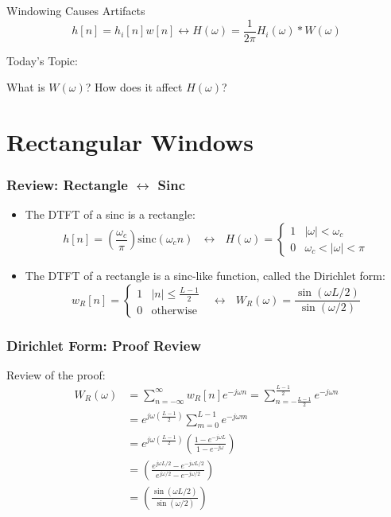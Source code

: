 \documentclass{beamer}
\begin{document}
\begin{frame}
  \begin{block}{Windowing Causes Artifacts}
    \[
    h[n] = h_{i}[n]w[n] \leftrightarrow H(\omega) = \frac{1}{2\pi}H_i(\omega)\ast W(\omega)
    \]
  \end{block}
  \begin{block}{Today's Topic:}
    \centerline{What is $W(\omega)$? How does it affect $H(\omega)$?}
  \end{block}
\end{frame}

\section[Rectangular]{Rectangular Windows}
\setcounter{subsection}{1}

\begin{frame}
  \frametitle{Review: Rectangle $\leftrightarrow$ Sinc}

  \begin{itemize}
  \item The DTFT of a sinc is a rectangle:
    \begin{displaymath}
      h[n] = \left(\frac{\omega_c}{\pi}\right)\mbox{sinc}(\omega_c n)
      ~~~\leftrightarrow~~~
      H(\omega)=\begin{cases}1&|\omega|<\omega_c\\
      0 & \omega_c<|\omega|<\pi
      \end{cases}
    \end{displaymath}
  \item The DTFT of a rectangle is a sinc-like function, called the
    Dirichlet form:
    \begin{displaymath}
      w_R[n] = \begin{cases}
        1 & |n|\le \frac{L-1}{2}\\
        0 &\mbox{otherwise}
      \end{cases}
      ~~~\leftrightarrow~~~
      W_R(\omega)= \frac{\sin(\omega L/2)}{\sin(\omega/2)}
    \end{displaymath}
  \end{itemize}
\end{frame}

\begin{frame}
  \frametitle{Dirichlet Form: Proof Review}

  Review of the proof:
  \begin{align*}
    W_R(\omega) &= \sum_{n=-\infty}^\infty w_R[n]e^{-j\omega n}
    = \sum_{n=-\frac{L-1}{2}}^{\frac{L-1}{2}} e^{-j\omega n}\\
    &= e^{j\omega\left(\frac{L-1}{2}\right)} \sum_{m=0}^{L-1} e^{-j\omega m}\\
    &= e^{j\omega\left(\frac{L-1}{2}\right)} \left(\frac{1-e^{-j\omega L}}{1-e^{-j\omega}}\right)\\
    &= \left(\frac{e^{j\omega L/2}-e^{-j\omega L/2}}{e^{j\omega/2}-e^{-j\omega/2}}\right)\\
    &= \left(\frac{\sin(\omega L/2)}{\sin(\omega/2)}\right)
  \end{align*}
\end{frame}
\end{document}
